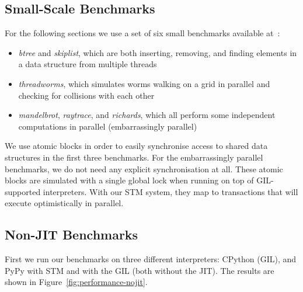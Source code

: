 \documentclass{sigplanconf}
\newcommand{\mynote}[2]{%
  \textcolor{red}{%
    \fbox{\bfseries\sffamily\scriptsize#1}%
    {\small$\blacktriangleright$\textsf{\emph{#2}}$\blacktriangleleft$}%
  }%
}
\newcommand\remi[1]{\mynote{Remi}{#1}}
\begin{document}
\subsection{Small-Scale Benchmarks\label{sec:performance-bench}}

For the following sections we use a set of six small benchmarks
available at~\cite{pypybenchs}:

\begin{itemize}
\item \emph{btree} and \emph{skiplist}, which are both inserting,
  removing, and finding elements in a data structure from multiple
  threads
\item \emph{threadworms}, which simulates worms walking on a grid in
  parallel and checking for collisions with each other
\item \emph{mandelbrot}, \emph{raytrace}, and \emph{richards}, which
  all perform some independent computations in parallel (embarrassingly
  parallel)
\end{itemize}

We use atomic blocks in order to easily synchronise access to shared
data structures in the first three benchmarks. For the embarrassingly
parallel benchmarks, we do not need any explicit synchronisation at
all. These atomic blocks are simulated with a single global lock
when running on top of GIL-supported interpreters. With our STM
system, they map to transactions that will execute optimistically
in parallel.









\subsection{Non-JIT Benchmarks}
First we run our benchmarks on three different interpreters: CPython
(GIL), and PyPy with STM and with the GIL (both without the JIT). The
results are shown in Figure~\ref{fig:performance-nojit}.
\end{document}
